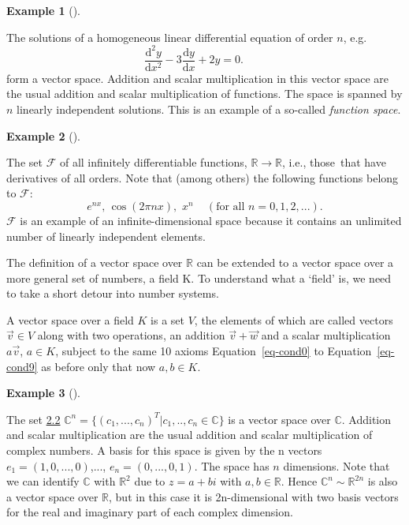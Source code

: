 \documentclass[
  a4paper,
  DIV=11,
  numbers=noendperiod,
  oneside]{scrreprt}
\theoremstyle{definition}
\newtheorem{example}{Example}[chapter]
\theoremstyle{remark}
\newenvironment{fbxSimple}[3]{\begin{tcolorbox}[enhanced, breakable,%
attach boxed title to top*={xshift=1.4pt},
boxed title style={boxrule=0.0mm, fuzzy shadow={1pt}{-1pt}{0mm}{0.1mm}{gray}, arc=.3em, rounded corners=east, sharp corners=west}, colframe=#1-color2, colbacktitle=#1-color1, colback = white, coltitle=black,  titlerule=0mm, toprule=0pt, bottomrule=.7pt, leftrule=.3em, rightrule=.7pt, outer arc=.3em,  	left=.5em, right=.5em, bottomtitle=1mm, toptitle=1mm,title=\textbf{#2}\hspace{0.5em}{#3}]}
{\end{tcolorbox}}
\begin{document}
\begin{example}[]\protect\hypertarget{exm-vktspace7}{}\label{exm-vktspace7}

The solutions of a homogeneous linear differential equation of order
\(n\), e.g.
\[\frac{\mathrm{d}^{2}y}{\mathrm{d}x^{2}}-3\frac{\mathrm{d}y}{\mathrm{d}x}
+2y=0.\qquad\] form a vector space. Addition and scalar multiplication
in this vector space are the usual addition and scalar multiplication of
functions. The space is spanned by \(n\) linearly independent solutions.
This is an example of a so-called \emph{function space}.

\end{example}

\begin{example}[]\protect\hypertarget{exm-vktspace8}{}\label{exm-vktspace8}

The set \(\mathcal{F}\) of all infinitely differentiable functions,
\(\mathbb{R} \rightarrow \mathbb{R}\), i.e., those~that have derivatives
of all orders. Note that (among others) the following functions belong
to \(\mathcal{F}\): \[e^{nx},\,\cos \left( 2\pi nx\right)
,\,\,x^{n}\quad \,(\text{for all }n=0,1,2,...).\] \(\mathcal{F}\) is an
example of an infinite-dimensional space because it contains an
unlimited number of linearly independent elements.

\end{example}

The definition of a vector space over \(\mathbb{R}\) can be extended to
a vector space over a more general set of numbers, a field K. To
understand what a `field' is, we need to take a short detour into number
systems.

\label{vksoverk}
\begin{fbxSimple}{Definition}{Definition 2.2: }{Vector Space over K}
\label{vksoverk}
A vector space over a field \(K\) is a set \(V\), the elements of which
are called vectors \(\vec{v} \in V\) along with two operations, an
addition \(\vec{v} + \vec{w}\) and a scalar multiplication
\(a \vec{v}\), \(a \in K\), subject to the same 10 axioms
Equation~\ref{eq-cond0} to Equation~\ref{eq-cond9} as before only that
now \(a,b\in K\).

\end{fbxSimple}

\begin{example}[]\protect\hypertarget{exm-vktspace9}{}\label{exm-vktspace9}

The set \hyperref[vksoverk]{2.2}
\(\mathbb{C}^{n} =\{ (c_{1},...,c_{n})^{T}| c_{1},..,c_{n}\in \mathbb{C}\}\)
is a vector space over \(\mathbb{C}\). Addition and scalar
multiplication are the usual addition and scalar multiplication of
complex numbers. A basis for this space is given by the n vectors
\(e_{1}=(1,0,...,0)\),..., \(e_{n}=(0,...,0,1)\). The space has \(n\)
dimensions. Note that we can identify \(\mathbb{C}\) with
\(\mathbb{R}^{2}\) due to \(z= a + b i\) with \(a,b \in \mathbb{R}\).
Hence \(\mathbb{C}^{n}  \sim \mathbb{R}^{2n}\) is also a vector space
over \(\mathbb{R}\), but in this case it is 2n-dimensional with two
basis vectors for the real and imaginary part of each complex dimension.

\end{example}
\end{document}
